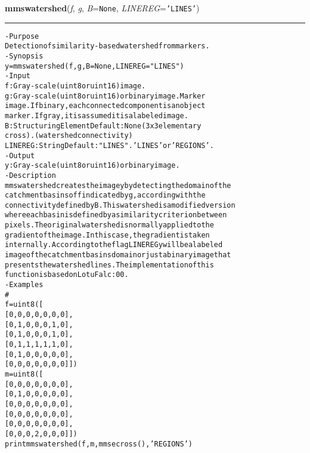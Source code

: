     \label{multireg:num_pymorph:mmswatershed}
    \vspace{0.5ex}

    \begin{boxedminipage}{\textwidth}

    \raggedright \textbf{mmswatershed}(\textit{f}, \textit{g}, \textit{B}=\texttt{N\-o\-n\-e\-}, \textit{LINEREG}=\texttt{'\-L\-I\-N\-E\-S\-'\-})

    \vspace{-1.5ex}

    \rule{\textwidth}{0.5\fboxrule}
\begin{alltt}
- Purpose
    Detection of similarity-based watershed from markers.
- Synopsis
    y = mmswatershed(f, g, B=None, LINEREG="LINES")
- Input
    f:       Gray-scale (uint8 or uint16) image.
    g:       Gray-scale (uint8 or uint16) or binary image. Marker
             image. If binary, each connected component is an object
             marker. If gray, it is assumed it is a labeled image.
    B:       Structuring Element Default: None (3x3 elementary
             cross). (watershed connectivity)
    LINEREG: String Default: "LINES". 'LINES' or ' REGIONS'.
- Output
    y: Gray-scale (uint8 or uint16) or binary image.
- Description
    mmswatershed creates the image y by detecting the domain of the
    catchment basins of f indicated by g , according with the
    connectivity defined by B . This watershed is a modified version
    where each basin is defined by a similarity criterion between
    pixels. The original watershed is normally applied to the
    gradient of the image. In this case, the gradient is taken
    internally. According to the flag LINEREG y will be a labeled
    image of the catchment basins domain or just a binary image that
    presents the watershed lines. The implementation of this
    function is based on LotuFalc:00 .
- Examples
    \#
    f = uint8([
        [0,  0,  0,  0,  0,  0,  0],
        [0,  1,  0,  0,  0,  1,  0],
        [0,  1,  0,  0,  0,  1,  0],
        [0,  1,  1,  1,  1,  1,  0],
        [0,  1,  0,  0,  0,  0,  0],
        [0,  0,  0,  0,  0,  0,  0]])
    m = uint8([
        [0,  0,  0,  0,  0,  0,  0],
        [0,  1,  0,  0,  0,  0,  0],
        [0,  0,  0,  0,  0,  0,  0],
        [0,  0,  0,  0,  0,  0,  0],
        [0,  0,  0,  0,  0,  0,  0],
        [0,  0,  0,  2,  0,  0,  0]])
    print mmswatershed(f,m,mmsecross(),'REGIONS')\end{alltt}

    \vspace{1ex}

    \end{boxedminipage}

